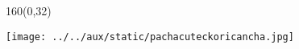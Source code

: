 \documentclass[shownotes,aspectratio=169]{beamer}
\begin{document}
\begin{frame}[plain]
\begin{textblock}{160}(0,32)
\centering
{}
\end{textblock}

\end{frame}



 
\begin{frame}[plain]
\centering
  \texttt{[image: ../../aux/static/pachacuteckoricancha.jpg]}
\end{frame}
\end{document}
